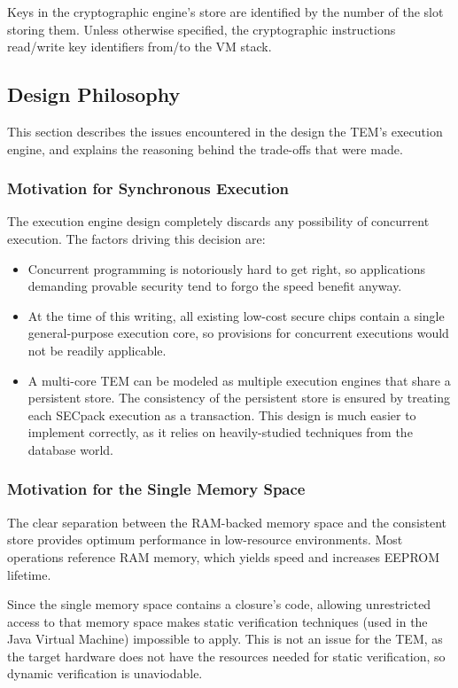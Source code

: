 Keys in the cryptographic engine's store are identified by the number of the
slot storing them. Unless otherwise specified, the cryptographic instructions
read/write key identifiers from/to the VM stack.

\subsection{Design Philosophy}\label{arch:vm_philosophy}
This section describes the issues encountered in the design the TEM's
execution engine, and explains the reasoning behind the trade-offs that were
made.

\subsubsection{Motivation for Synchronous Execution}
The execution engine design completely discards any possibility of concurrent
execution. The factors driving this decision are:
\begin{itemize}
  \item Concurrent programming is notoriously hard to get right, so
  applications demanding provable security tend to forgo the speed benefit
  anyway.
  \item At the time of this writing, all existing low-cost secure chips contain
  a single general-purpose execution core, so provisions for concurrent
  executions would not be readily applicable.
  \item A multi-core TEM can be modeled as multiple execution engines that
  share a persistent store. The consistency of the persistent store is ensured 
  by treating each SECpack execution as a transaction. This design is much
  easier to implement correctly, as it relies on heavily-studied techniques
  from the database world.
\end{itemize}

\subsubsection{Motivation for the Single Memory Space}
The clear separation between the RAM-backed memory space and the consistent
store provides optimum performance in low-resource environments. Most
operations reference RAM memory, which yields speed and increases EEPROM
lifetime.

Since the single memory space contains a closure's code, allowing unrestricted
access to that memory space makes static verification techniques (used in the
Java Virtual Machine) impossible to apply. This is not an issue for the TEM, as
the target hardware does not have the resources needed for static verification,
so dynamic verification is unaviodable.

